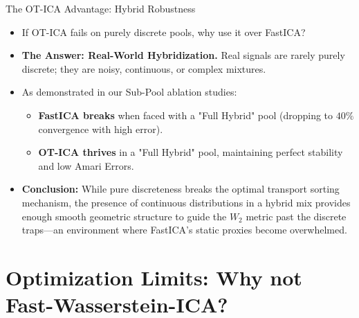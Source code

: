 \documentclass{beamer}
\begin{document}
\begin{frame}{The OT-ICA Advantage: Hybrid Robustness}
  \begin{itemize}
    \item If OT-ICA fails on purely discrete pools, why use it over FastICA?
    \item \textbf{The Answer: Real-World Hybridization.} Real signals are rarely purely discrete; they are noisy, continuous, or complex mixtures.
    \item As demonstrated in our Sub-Pool ablation studies:
      \begin{itemize}
        \item \textbf{FastICA breaks} when faced with a "Full Hybrid" pool (dropping to $40\%$ convergence with high error).
        \item \textbf{OT-ICA thrives} in a "Full Hybrid" pool, maintaining perfect stability and low Amari Errors.
      \end{itemize}
    \item \textbf{Conclusion:} While pure discreteness breaks the optimal transport sorting mechanism, the presence of continuous distributions in a hybrid mix provides enough smooth geometric structure to guide the $W_2$ metric past the discrete traps—an environment where FastICA's static proxies become overwhelmed.
  \end{itemize}
\end{frame}


\section{Optimization Limits: Why not Fast-Wasserstein-ICA?}
\end{document}
